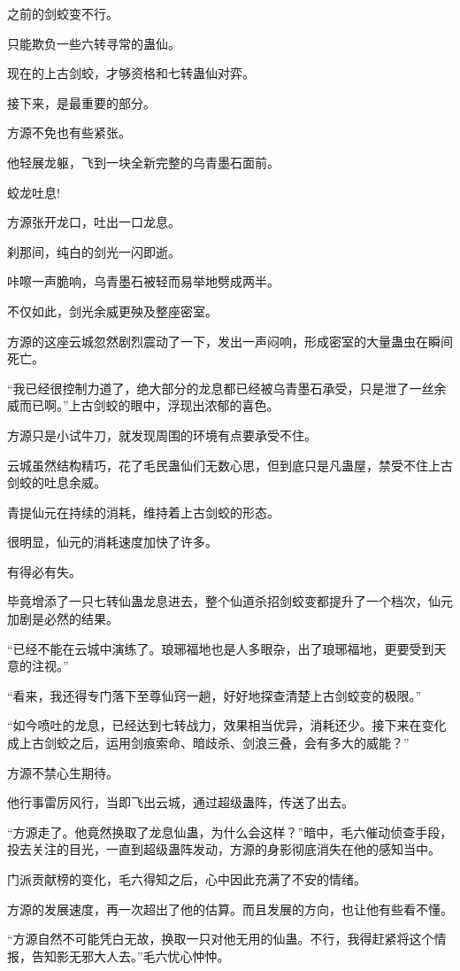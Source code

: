 \begin{this_body}
之前的剑蛟变不行。

只能欺负一些六转寻常的蛊仙。

现在的上古剑蛟，才够资格和七转蛊仙对弈。

接下来，是最重要的部分。

方源不免也有些紧张。

他轻展龙躯，飞到一块全新完整的乌青墨石面前。

蛟龙吐息!

方源张开龙口，吐出一口龙息。

刹那间，纯白的剑光一闪即逝。

咔嚓一声脆响，乌青墨石被轻而易举地劈成两半。

不仅如此，剑光余威更殃及整座密室。

方源的这座云城忽然剧烈震动了一下，发出一声闷响，形成密室的大量蛊虫在瞬间死亡。

“我已经很控制力道了，绝大部分的龙息都已经被乌青墨石承受，只是泄了一丝余威而已啊。”上古剑蛟的眼中，浮现出浓郁的喜色。

方源只是小试牛刀，就发现周围的环境有点要承受不住。

云城虽然结构精巧，花了毛民蛊仙们无数心思，但到底只是凡蛊屋，禁受不住上古剑蛟的吐息余威。

青提仙元在持续的消耗，维持着上古剑蛟的形态。

很明显，仙元的消耗速度加快了许多。

有得必有失。

毕竟增添了一只七转仙蛊龙息进去，整个仙道杀招剑蛟变都提升了一个档次，仙元加剧是必然的结果。

“已经不能在云城中演练了。琅琊福地也是人多眼杂，出了琅琊福地，更要受到天意的注视。”

“看来，我还得专门落下至尊仙窍一趟，好好地探查清楚上古剑蛟变的极限。”

“如今喷吐的龙息，已经达到七转战力，效果相当优异，消耗还少。接下来在变化成上古剑蛟之后，运用剑痕索命、暗歧杀、剑浪三叠，会有多大的威能？”

方源不禁心生期待。

他行事雷厉风行，当即飞出云城，通过超级蛊阵，传送了出去。

“方源走了。他竟然换取了龙息仙蛊，为什么会这样？”暗中，毛六催动侦查手段，投去关注的目光，一直到超级蛊阵发动，方源的身影彻底消失在他的感知当中。

门派贡献榜的变化，毛六得知之后，心中因此充满了不安的情绪。

方源的发展速度，再一次超出了他的估算。而且发展的方向，也让他有些看不懂。

“方源自然不可能凭白无故，换取一只对他无用的仙蛊。不行，我得赶紧将这个情报，告知影无邪大人去。”毛六忧心忡忡。

\end{this_body}


